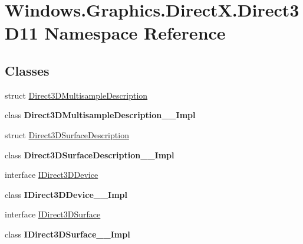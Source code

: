 \hypertarget{namespace_windows_1_1_graphics_1_1_direct_x_1_1_direct3_d11}{}\section{Windows.\+Graphics.\+Direct\+X.\+Direct3\+D11 Namespace Reference}
\label{namespace_windows_1_1_graphics_1_1_direct_x_1_1_direct3_d11}
\subsection*{Classes}
\begin{DoxyCompactItemize}
\item 
struct \hyperlink{struct_windows_1_1_graphics_1_1_direct_x_1_1_direct3_d11_1_1_direct3_d_multisample_description}{Direct3\+D\+Multisample\+Description}
\item 
class {\bfseries Direct3\+D\+Multisample\+Description\+\_\+\+\_\+\+Impl}
\item 
struct \hyperlink{struct_windows_1_1_graphics_1_1_direct_x_1_1_direct3_d11_1_1_direct3_d_surface_description}{Direct3\+D\+Surface\+Description}
\item 
class {\bfseries Direct3\+D\+Surface\+Description\+\_\+\+\_\+\+Impl}
\item 
interface \hyperlink{interface_windows_1_1_graphics_1_1_direct_x_1_1_direct3_d11_1_1_i_direct3_d_device}{I\+Direct3\+D\+Device}
\item 
class {\bfseries I\+Direct3\+D\+Device\+\_\+\+\_\+\+Impl}
\item 
interface \hyperlink{interface_windows_1_1_graphics_1_1_direct_x_1_1_direct3_d11_1_1_i_direct3_d_surface}{I\+Direct3\+D\+Surface}
\item 
class {\bfseries I\+Direct3\+D\+Surface\+\_\+\+\_\+\+Impl}
\end{DoxyCompactItemize}
